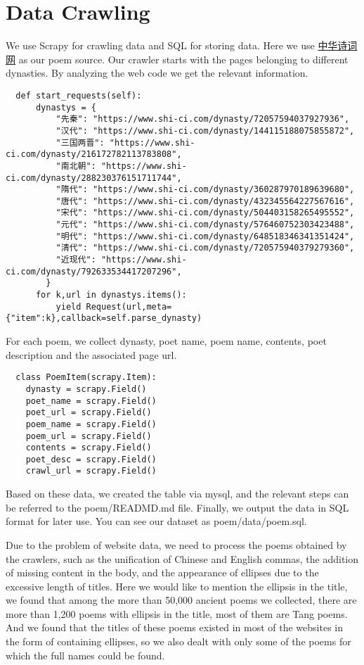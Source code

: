 \section{Data Crawling} \label{sec:crawl}

We use Scrapy for crawling data and SQL for storing data. Here we use \href{https://www.shi-ci.com/}{中华诗词网} as our poem source.
Our crawler starts with the pages belonging to different dynasties. By analyzing the web code we get the relevant information.
\begin{lstlisting}
  def start_requests(self):
      dynastys = {
          "先秦": "https://www.shi-ci.com/dynasty/72057594037927936", 
          "汉代": "https://www.shi-ci.com/dynasty/144115188075855872", 
          "三国两晋": "https://www.shi-ci.com/dynasty/216172782113783808", 
          "南北朝": "https://www.shi-ci.com/dynasty/288230376151711744", 
          "隋代": "https://www.shi-ci.com/dynasty/360287970189639680", 
          "唐代": "https://www.shi-ci.com/dynasty/432345564227567616",
          "宋代": "https://www.shi-ci.com/dynasty/504403158265495552", 
          "元代": "https://www.shi-ci.com/dynasty/576460752303423488", 
          "明代": "https://www.shi-ci.com/dynasty/648518346341351424",
          "清代": "https://www.shi-ci.com/dynasty/720575940379279360", 
          "近现代": "https://www.shi-ci.com/dynasty/792633534417207296",
        }
      for k,url in dynastys.items():
          yield Request(url,meta={"item":k},callback=self.parse_dynasty)
\end{lstlisting}

For each poem, we collect dynasty, poet name, poem name, contents, poet description and the associated page url. 
\begin{lstlisting}
  class PoemItem(scrapy.Item):
    dynasty = scrapy.Field()
    poet_name = scrapy.Field()
    poet_url = scrapy.Field()
    poem_name = scrapy.Field()
    poem_url = scrapy.Field()
    contents = scrapy.Field()
    poet_desc = scrapy.Field()
    crawl_url = scrapy.Field()
\end{lstlisting}

Based on these data, we created the table via mysql, and the relevant steps can be referred to the poem/READMD.md file. Finally, we output the data in SQL format for later use. You can see our dataset as poem/data/poem.sql.  

Due to the problem of website data, we need to process the poems obtained by the crawlers, such as the unification of Chinese and English commas, the addition of missing content in the body, and the appearance of ellipses due to the excessive length of titles. Here we would like to mention the ellipsis in the title, we found that among the more than 50,000 ancient poems we collected, there are more than 1,200 poems with ellipsis in the title, most of them are Tang poems. And we found that the titles of these poems existed in most of the websites in the form of containing ellipses, so we also dealt with only some of the poems for which the full names could be found.

